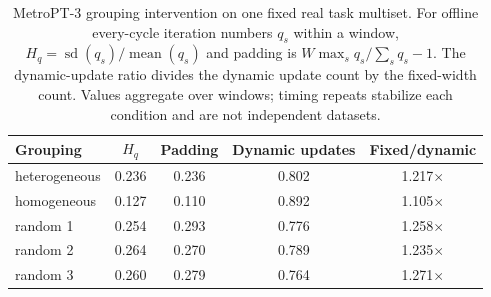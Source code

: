 \begin{table}[!h]
\centering
\caption{MetroPT-3 grouping intervention on one fixed real task multiset. For
offline every-cycle iteration numbers $q_s$ within a window,
$H_q=\operatorname{sd}(q_s)/\operatorname{mean}(q_s)$ and
padding is $W\max_s q_s/\sum_s q_s-1$. The dynamic-update ratio divides the
dynamic update count by the fixed-width count. Values aggregate over windows;
timing repeats stabilize each condition and are not independent datasets.}
\label{tab:metropt-grouping}
\scriptsize
\setlength{\tabcolsep}{3pt}
\begin{tabular}{@{}lcccc@{}}
\toprule
Grouping & $H_q$ & Padding & Dynamic updates & Fixed/dynamic \\
\midrule
heterogeneous & 0.236 & 0.236 & 0.802 & 1.217$\times$ \\
homogeneous & 0.127 & 0.110 & 0.892 & 1.105$\times$ \\
random 1 & 0.254 & 0.293 & 0.776 & 1.258$\times$ \\
random 2 & 0.264 & 0.270 & 0.789 & 1.235$\times$ \\
random 3 & 0.260 & 0.279 & 0.764 & 1.271$\times$ \\
\bottomrule
\end{tabular}
\end{table}
